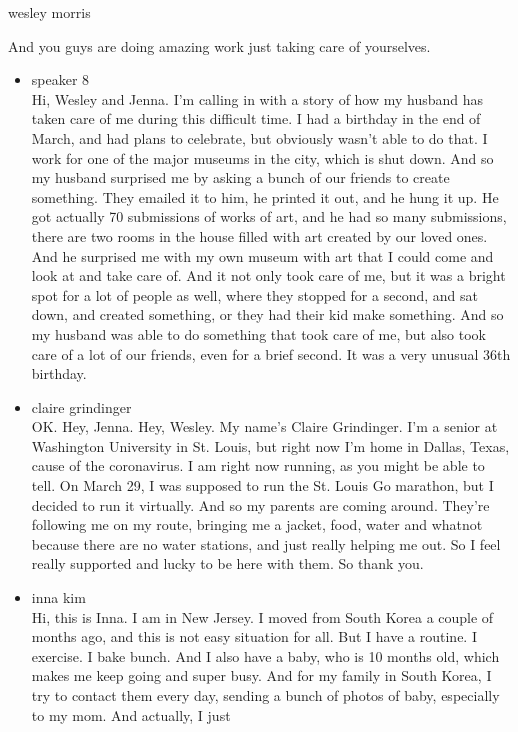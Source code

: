wesley morris

And you guys are doing amazing work just taking care of yourselves.

\begin{itemize}
\item
  speaker 8\\
  Hi, Wesley and Jenna. I'm calling in with a story of how my husband
  has taken care of me during this difficult time. I had a birthday in
  the end of March, and had plans to celebrate, but obviously wasn't
  able to do that. I work for one of the major museums in the city,
  which is shut down. And so my husband surprised me by asking a bunch
  of our friends to create something. They emailed it to him, he printed
  it out, and he hung it up. He got actually 70 submissions of works of
  art, and he had so many submissions, there are two rooms in the house
  filled with art created by our loved ones. And he surprised me with my
  own museum with art that I could come and look at and take care of.
  And it not only took care of me, but it was a bright spot for a lot of
  people as well, where they stopped for a second, and sat down, and
  created something, or they had their kid make something. And so my
  husband was able to do something that took care of me, but also took
  care of a lot of our friends, even for a brief second. It was a very
  unusual 36th birthday.
\item
  claire grindinger\\
  OK. Hey, Jenna. Hey, Wesley. My name's Claire Grindinger. I'm a senior
  at Washington University in St. Louis, but right now I'm home in
  Dallas, Texas, cause of the coronavirus. I am right now running, as
  you might be able to tell. On March 29, I was supposed to run the St.
  Louis Go marathon, but I decided to run it virtually. And so my
  parents are coming around. They're following me on my route, bringing
  me a jacket, food, water and whatnot because there are no water
  stations, and just really helping me out. So I feel really supported
  and lucky to be here with them. So thank you.
\item
  inna kim\\
  Hi, this is Inna. I am in New Jersey. I moved from South Korea a
  couple of months ago, and this is not easy situation for all. But I
  have a routine. I exercise. I bake bunch. And I also have a baby, who
  is 10 months old, which makes me keep going and super busy. And for my
  family in South Korea, I try to contact them every day, sending a
  bunch of photos of baby, especially to my mom. And actually, I just

\end{itemize}
